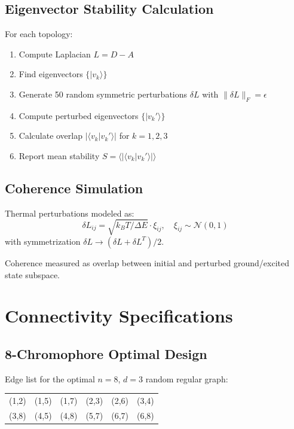 \documentclass[11pt,a4paper]{article}
\theoremstyle{plain}
\theoremstyle{definition}
\theoremstyle{remark}
\begin{document}
\subsection{Eigenvector Stability Calculation}

For each topology:
\begin{enumerate}
    \item Compute Laplacian $L = D - A$
    \item Find eigenvectors $\{|v_k\rangle\}$
    \item Generate 50 random symmetric perturbations $\delta L$ with $\|\delta L\|_F = \epsilon$
    \item Compute perturbed eigenvectors $\{|v_k'\rangle\}$
    \item Calculate overlap $|\langle v_k | v_k' \rangle|$ for $k = 1, 2, 3$
    \item Report mean stability $S = \langle |\langle v_k | v_k' \rangle| \rangle$
\end{enumerate}

\subsection{Coherence Simulation}

Thermal perturbations modeled as:
\begin{equation}
\delta L_{ij} = \sqrt{k_B T / \Delta E} \cdot \xi_{ij}, \quad \xi_{ij} \sim \mathcal{N}(0, 1)
\end{equation}
with symmetrization $\delta L \to (\delta L + \delta L^T)/2$.

Coherence measured as overlap between initial and perturbed ground/excited state subspace.

\section{Connectivity Specifications}

\subsection{8-Chromophore Optimal Design}

Edge list for the optimal $n=8$, $d=3$ random regular graph:

\begin{center}
\begin{tabular}{cccccc}
(1,2) & (1,5) & (1,7) & (2,3) & (2,6) & (3,4) \\
(3,8) & (4,5) & (4,8) & (5,7) & (6,7) & (6,8) \\
\end{tabular}
\end{center}
\end{document}
